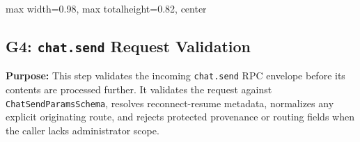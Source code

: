 \begin{center}
\begin{adjustbox}{
    max width=0.98\textwidth,
    max totalheight=0.82\textheight,
    center
}

\end{adjustbox}

\end{center}


\subsection*{G4: \texttt{chat.send} Request Validation}

\textbf{Purpose:}
This step validates the incoming \texttt{chat.send} RPC envelope before
its contents are processed further. It validates the request against
\texttt{ChatSendParamsSchema}, resolves reconnect-resume metadata,
normalizes any explicit originating route, and rejects protected
provenance or routing fields when the caller lacks administrator scope.

